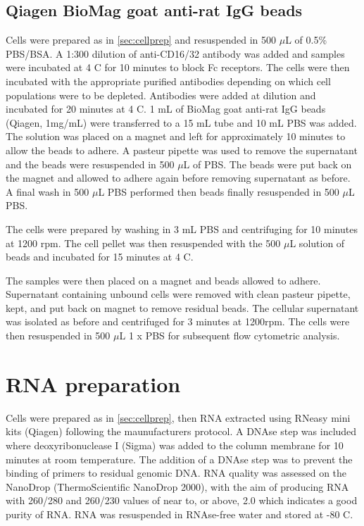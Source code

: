 \subsection{Qiagen BioMag goat anti-rat IgG beads}

Cells were prepared as in \cref{sec:cellprep} and resuspended in 500 $\mu$L of 0.5\% PBS/BSA.
A 1:300 dilution of anti-CD16/32 antibody was added and samples were incubated at 4 \textdegree C for 10 minutes to block Fc receptors.
The cells were then incubated with the appropriate purified antibodies depending on which cell populations were to be depleted.
Antibodies were added at  dilution and incubated for 20 minutes at 4 \textdegree C.
1 mL of BioMag goat anti-rat IgG beads (Qiagen, 1mg/mL) were transferred to a 15 mL tube and 10 mL PBS was added.
The solution was placed on a magnet and left for approximately 10 minutes to allow the beads to adhere.
A pasteur pipette was used to remove the supernatant and the beads were resuspended in 500 $\mu$L of PBS.
The beads were put back on the magnet and allowed to adhere again before removing supernatant as before.
A final wash in 500 $\mu$L PBS performed then beads finally resuspended in 500 $\mu$L PBS.

The cells were prepared by washing in 3 mL PBS and centrifuging for 10 minutes at 1200 rpm.
The cell pellet was then resuspended with the 500 $\mu$L solution of beads and incubated for 15 minutes at 4 \textdegree C.

The samples were then placed on a magnet and beads allowed to adhere.
Supernatant containing unbound cells were removed with clean pasteur pipette, kept, and put back on magnet to remove residual beads.
The cellular supernatant was isolated as before and centrifuged for 3 minutes at 1200rpm.
The cells were then resuspended in 500 $\mu$L 1 x PBS for subsequent flow cytometric analysis.

\section{RNA preparation}

Cells were prepared as in \cref{sec:cellprep}, then RNA extracted using RNeasy mini kits (Qiagen) following the maunufacturers protocol.
A DNAse step was included where deoxyribonuclease I (Sigma) was added to the column membrane for 10 minutes at room temperature.
The addition of a DNAse step was to prevent the binding of primers to residual genomic DNA.
RNA quality was assessed on the NanoDrop (ThermoScientific NanoDrop 2000), with the aim of producing RNA with 260/280 and 260/230 values of near to, or above, 2.0 which indicates a good purity of RNA.
RNA was resuspended in RNAse-free water and stored at -80 \textdegree C.


